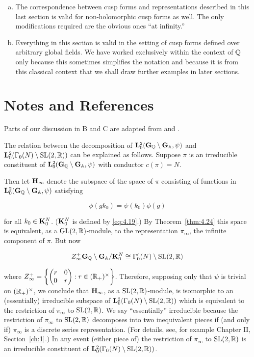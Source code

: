 \begin{enumerate}[(a)]

\item The correspondence between cusp forms and representations described in this last section is valid for non-holomorphic cusp forms as well. The only modifications required are the obvious ones ``at infinity.''

\item Everything in this section is valid in the setting of cusp forms defined over arbitrary global fields. We have worked exclusively within the context of $\mathbb{Q}$ only because this sometimes simplifies the notation and because it is from this classical context that we shall draw further examples in later sections.

\end{enumerate}

\section*{Notes and References}


Parts of our discussion in B and C are adapted from \cite{Casselman} and \cite{Miyake}.

The relation between the decomposition of $\mathbf{L}_0^2(\mathbf{G}_{\mathbb{Q}} \setminus \mathbf{G}_{\mathbb{A}}, \psi)$ and $\mathbf{L}_0^2(\Gamma_0(N) \setminus \operatorname{SL}(2,\mathbb{R}))$ can be explained as follows. Suppose $\pi$ is an irreducible constituent of $\mathbf{L}_0^2(\mathbf{G}_{\mathbb{Q}} \setminus \mathbf{G}_{\mathbb{A}}, \psi)$ with conductor $c(\pi) = N$.

Then let $\mathbf{H}_{\infty}$ denote the subspace of the space of $\pi$ consisting of functions in $\mathbf{L}_0^2(\mathbf{G}_{\mathbb{Q}} \setminus \mathbf{G}_{\mathbb{A}}, \psi)$ satisfying

\[
\phi(gk_0) = \psi(k_0)\phi(g)
\]

for all $k_0 \in \mathbf{K}_0^N$. ($\mathbf{K}_0^N$ is defined by \eqref{eq:4.19}.) By Theorem~\ref{thm:4.24} this space is equivalent, as a $\operatorname{GL}(2,\mathbb{R})$-module, to the representation $\pi_{\infty}$, the infinite component of $\pi$. But now

\[
Z_{\infty}^+ \mathbf{G}_{\mathbb{Q}} \setminus \mathbf{G}_{\mathbb{A}} / \mathbf{K}_0^N \cong \Gamma_0'(N) \setminus \operatorname{SL}(2,\mathbb{R})
\]

where $Z_{\infty}^+ = \left\{\begin{pmatrix} r & 0 \\ 0 & r \end{pmatrix} : r \in (\mathbb{R}_+)^{\times}\right\}$. Therefore, supposing only that $\psi$ is trivial on $(\mathbb{R}_+)^{\times}$, we conclude that $\mathbf{H}_{\infty}$, as a $\operatorname{SL}(2,\mathbb{R})$-module, is isomorphic to an (essentially) irreducible subspace of $\mathbf{L}_0^2(\Gamma_0(N) \setminus \operatorname{SL}(2,\mathbb{R}))$ which is equivalent to the restriction of $\pi_{\infty}$ to $\operatorname{SL}(2,\mathbb{R})$. We say ``essentially'' irreducible because the restriction of $\pi_{\infty}$ to $\operatorname{SL}(2,\mathbb{R})$ decomposes into two inequivalent pieces if (and only if) $\pi_{\infty}$ is a discrete series representation. (For details, see, for example \cite{Gelbart} Chapter II, Section~\ref{ch:1}.) In any event (either piece of) the restriction of $\pi_{\infty}$ to $\operatorname{SL}(2,\mathbb{R})$ is an irreducible constituent of $\mathbf{L}_0^2(\Gamma_0(N) \setminus \operatorname{SL}(2,\mathbb{R}))$.

